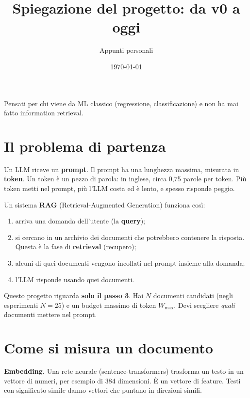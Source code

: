 \documentclass[11pt,a4paper]{article}
\title{Spiegazione del progetto: da v0 a oggi}
\author{Appunti personali}
\date{\today}
\begin{document}
\maketitle

\begin{nota}
Pensati per chi viene da ML classico (regressione, classificazione) e non ha mai fatto information retrieval.
\end{nota}

\tableofcontents
\newpage

\section{Il problema di partenza}

Un LLM riceve un \textbf{prompt}. Il prompt ha una lunghezza massima, misurata in \textbf{token}. Un token è un pezzo di parola: in inglese, circa 0,75 parole per token. Più token metti nel prompt, più l'LLM costa ed è lento, e spesso risponde peggio.

Un sistema \textbf{RAG} (Retrieval-Augmented Generation) funziona così:
\begin{enumerate}
  \item arriva una domanda dell'utente (la \textbf{query});
  \item si cercano in un archivio dei documenti che potrebbero contenere la risposta. Questa è la fase di \textbf{retrieval} (recupero);
  \item alcuni di quei documenti vengono incollati nel prompt insieme alla domanda;
  \item l'LLM risponde usando quei documenti.
\end{enumerate}

Questo progetto riguarda \textbf{solo il passo 3}. Hai $N$ documenti candidati (negli esperimenti $N=25$) e un budget massimo di token $W_{\max}$. Devi scegliere \emph{quali} documenti mettere nel prompt.

\section{Come si misura un documento}

\textbf{Embedding.} Una rete neurale (sentence-transformers) trasforma un testo in un vettore di numeri, per esempio di 384 dimensioni. È un vettore di feature. Testi con significato simile danno vettori che puntano in direzioni simili.
\end{document}
